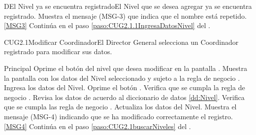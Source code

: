 		\begin{UCtrayectoriaA}{D}{El Nivel ya se encuentra registrado}{El Nivel que se desea agregar ya se encuentra registrado.}
			\UCpaso Muestra el mensaje (MSG-3) que indica que el nombre está repetido.\ref{MSG3}
			\UCpaso Continúa en el paso \ref{paso:CUG2.1.1IngresaDatosNivel} del .
		\end{UCtrayectoriaA}

	\begin{UseCase}{CUG2.1}{Modificar Coordinador}{El Director General selecciona un Coordinador registrado para modificar sus datos.}
	\end{UseCase}

	\begin{UCtrayectoria}{Principal}			
			\UCpaso[\UCactor] Oprime el botón  del nivel que desea modificar en la pantalla .	
			\UCpaso Muestra la pantalla  con los datos del Nivel seleccionado y sujeto a la regla de negocio .
                        \UCpaso [\UCactor] Ingresa los datos del Nivel.\label{paso:CUG2.1.2ingresaDatosNivel}
			\UCpaso [\UCactor] Oprime el botón .
			\UCpaso Verifica que se cumpla la regla de negocio .  
			\UCpaso Revisa los datos de acuerdo al diccionario de datos \ref{dd:Nivel}. 
			\UCpaso Verifica que se cumpla las regla de negocio  .  
			\UCpaso Actualiza los datos del Nivel.
			\UCpaso Muestra el mensaje (MSG-4) indicando que se ha modificado correctamente el registro.\ref{MSG4}
			\UCpaso Continúa en el paso \ref{paso:CUG2.1buscarNiveles} del .
	\end{UCtrayectoria}


